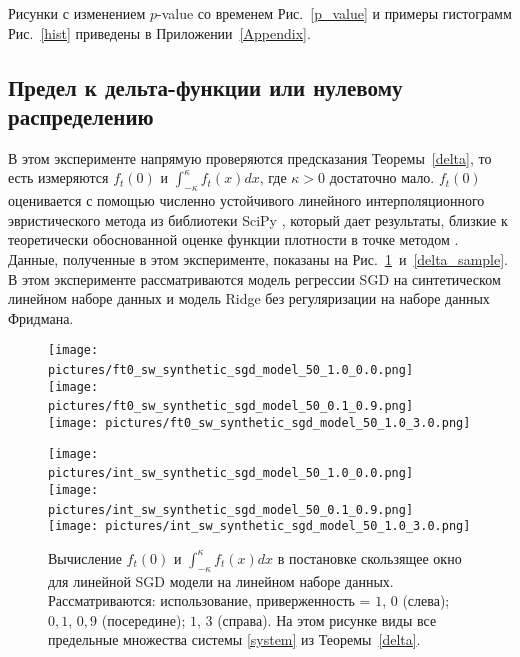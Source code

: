     Рисунки с изменением $p$-value со временем Рис.~\ref{p_value} и примеры гистограмм Рис.~\ref{hist} приведены в Приложении~\ref{Appendix}.

\subsection{Предел к дельта-функции или нулевому распределению} \label{exp_3}

    В этом эксперименте напрямую проверяются предсказания Теоремы~\ref{delta}, то есть измеряются $f_t(0)$ и $\int_{-\kappa}^{\kappa}f_t(x)dx$, где $\kappa > 0$ достаточно мало. $f_t(0)$ оценивается с помощью численно устойчивого линейного интерполяционного эвристического метода из библиотеки SciPy \citep{virtanen2020SciPy}, который дает результаты, близкие к теоретически обоснованной оценке функции плотности в точке методом \citep{silverman1986density}.
    Данные, полученные в этом эксперименте, показаны на Рис.~\ref{delta_loop}~и~\ref{delta_sample}. В этом эксперименте рассматриваются модель регрессии SGD на синтетическом линейном наборе данных и модель Ridge без регуляризации на наборе данных Фридмана.

    \begin{figure}[h!]
        \centering
        \texttt{[image: pictures/ft0\_sw\_synthetic\_sgd\_model\_50\_1.0\_0.0.png]}~
        \texttt{[image: pictures/ft0\_sw\_synthetic\_sgd\_model\_50\_0.1\_0.9.png]}~
        \texttt{[image: pictures/ft0\_sw\_synthetic\_sgd\_model\_50\_1.0\_3.0.png]}

        \texttt{[image: pictures/int\_sw\_synthetic\_sgd\_model\_50\_1.0\_0.0.png]}~
        \texttt{[image: pictures/int\_sw\_synthetic\_sgd\_model\_50\_0.1\_0.9.png]}~
        \texttt{[image: pictures/int\_sw\_synthetic\_sgd\_model\_50\_1.0\_3.0.png]}
        
        \caption{Вычисление $f_t(0)$ и $\int_{-\kappa}^{\kappa}f_t(x)dx$ в постановке скользящее окно для линейной SGD модели на линейном наборе данных. Рассматриваются: использование, приверженность = $1$, $0$ (слева); $0,1$, $0,9$ (посередине); $1$, $3$ (справа). На этом рисунке виды все предельные множества системы \eqref{system} из Теоремы~\ref{delta}.}
        \label{delta_loop}
    \end{figure}

